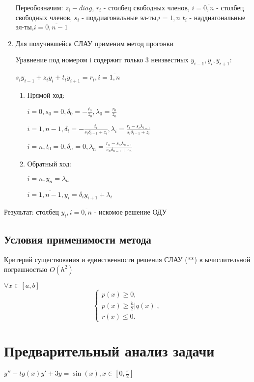 \documentclass{article}
\begin{document}
\begin{enumerate}
		Переобозначим:
		$z_i - diag$, $r_i$ - столбец свободных членов, $i=\overline{0,n}$ - столбец свободных членов, $s_i$ - поддиагональные эл-ты,$i=\overline{1,n}$ $t_i$ - наддиагональные эл-ты,$i=\overline{0,n-1}$
		
		\item Для получившейся СЛАУ применим метод прогонки
		
		Уравнение под номером i содержит только 3 неизвестных $y_{i-1}, y_i, y_{i+1}$:
		
		$s_iy_{i-1}+z_iy_i+t_iy_{i+1} = r_i, i = \overline{1,n}$
		
		\begin{enumerate}
			\item Прямой ход:
			
			$i = 0, s_0 = 0, \delta_0 = -\frac{t_0}{z_0}, \lambda_0 = \frac{r_0}{z_0}$
			
			$i = \overline{1, n-1}, \delta_i = -\frac{t_i}{s_i\delta_{i-1}+z_i}, \lambda_i = \frac{r_i-s_i\lambda_{i-1}}{s_i\delta_{i-1}+ z_i}$
			
			$i = n, t_0 = 0, \delta_n = 0, \lambda_n = \frac{r_n-s_n\lambda_{n-1}}{s_n\delta_{n-1}+ z_n}$
			
			\item Обратный ход:
			
			$i = n , y_n = \lambda_n$
			
			$i = \overline{1,n-1}, y_i = \delta_iy_{i+1} + \lambda_i$
		\end{enumerate}

	\end{enumerate}
	
	Результат: столбец $y_{i}, i = \overline{0,n}$ - искомое решение ОДУ
	
	\subsection{Условия применимости метода}
	Критерий существования и единственности решения СЛАУ (**) в ычислительной погрешностью $O(h^2)$
	
	$\forall x \in [a, b]$
	\begin{equation*}
		\begin{cases}
			p(x) \geq 0, 
			\\
			p(x) \geq \frac{h}{2}|q(x)|,
			\\
			r(x) \leq 0.
		\end{cases}
	\end{equation*}
	
	\section{Предварительный анализ задачи}
	$y'' -tg(x)y' +3y = \sin(x), x \in [0 , \frac{\pi}{2}]$
	
\end{document}

